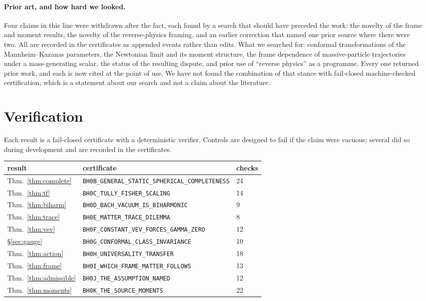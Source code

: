 \documentclass[11pt]{article}
\theoremstyle{definition}
\theoremstyle{remark}
\newcommand{\cert}[1]{\nolinkurl{#1}}
\begin{document}
\paragraph{Prior art, and how hard we looked.}
Four claims in this line were withdrawn after the fact, each found by a search
that should have preceded the work: the novelty of the frame and moment
results, the novelty of the reverse-physics framing, and an earlier correction
that named one prior source where there were two.  All are recorded in the
certificates as appended events rather than edits.  What we searched for:
conformal transformations of the Mannheim--Kazanas parameters, the Newtonian
limit and its moment structure, the frame dependence of massive-particle
trajectories under a mass-generating scalar, the status of the resulting
dispute, and prior use of ``reverse physics'' as a programme.  Every one
returned prior work, and each is now cited at the point of use.  We have not
found the combination of that stance with fail-closed machine-checked
certification, which is a statement about our search and not a claim about the
literature.

\section{Verification}
\label{sec:verification}

Each result is a fail-closed certificate with a deterministic verifier.
Controls are designed to fail if the claim were vacuous; several did so
during development and are recorded in the certificates.

\begin{center}
\begin{tabularx}{\textwidth}{@{}lYl@{}}
\toprule
result & certificate & checks \\
\midrule
Thm.~\ref{thm:complete} & \cert{BH0B\_GENERAL\_STATIC\_SPHERICAL\_COMPLETENESS} & 24 \\
Thm.~\ref{thm:tf}       & \cert{BH0C\_TULLY\_FISHER\_SCALING}                   & 14 \\
Thm.~\ref{thm:biharm}   & \cert{BH0D\_BACH\_VACUUM\_IS\_BIHARMONIC}             & 9 \\
Thm.~\ref{thm:trace}    & \cert{BH0E\_MATTER\_TRACE\_DILEMMA}                   & 8 \\
Thm.~\ref{thm:vev}      & \cert{BH0F\_CONSTANT\_VEV\_FORCES\_GAMMA\_ZERO}       & 12 \\
\S\ref{sec:gauge}       & \cert{BH0G\_CONFORMAL\_CLASS\_INVARIANCE}             & 10 \\
Thm.~\ref{thm:action}   & \cert{BH0H\_UNIVERSALITY\_TRANSFER}                   & 18 \\
Thm.~\ref{thm:frame}    & \cert{BH0I\_WHICH\_FRAME\_MATTER\_FOLLOWS}            & 13 \\
Thm.~\ref{thm:admissible} & \cert{BH0J\_THE\_ASSUMPTION\_NAMED}                 & 12 \\
Thm.~\ref{thm:moments}  & \cert{BH0K\_THE\_SOURCE\_MOMENTS}                     & 22 \\
\bottomrule
\end{tabularx}
\end{center}
\end{document}
